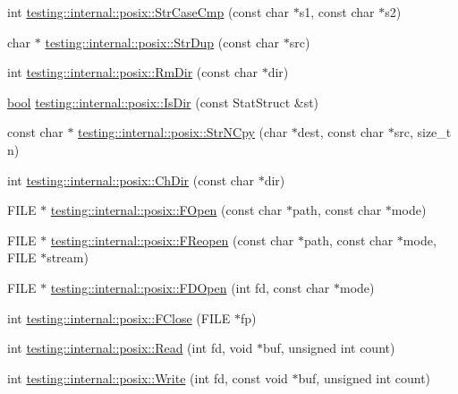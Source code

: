 \begin{DoxyCompactItemize}
\item 
int \hyperlink{namespacetesting_1_1internal_1_1posix_a1ef2385a7f8e4c706054da35967e76bd}{testing\+::internal\+::posix\+::\+Str\+Case\+Cmp} (const char $\ast$s1, const char $\ast$s2)
\item 
char $\ast$ \hyperlink{namespacetesting_1_1internal_1_1posix_a8e352884793a65ae8be144676f1a9136}{testing\+::internal\+::posix\+::\+Str\+Dup} (const char $\ast$src)
\item 
int \hyperlink{namespacetesting_1_1internal_1_1posix_acbad5d4ea5b73fd1765f5f760642932a}{testing\+::internal\+::posix\+::\+Rm\+Dir} (const char $\ast$dir)
\item 
\hyperlink{classbool}{bool} \hyperlink{namespacetesting_1_1internal_1_1posix_af0d04ed5baeed28353fa38742748a421}{testing\+::internal\+::posix\+::\+Is\+Dir} (const Stat\+Struct \&st)
\item 
const char $\ast$ \hyperlink{namespacetesting_1_1internal_1_1posix_a36fca815713332e5c6dc92c98b6b2574}{testing\+::internal\+::posix\+::\+Str\+N\+Cpy} (char $\ast$dest, const char $\ast$src, size\+\_\+t n)
\item 
int \hyperlink{namespacetesting_1_1internal_1_1posix_a1ddc8a4fc6bb21da372307485591a212}{testing\+::internal\+::posix\+::\+Ch\+Dir} (const char $\ast$dir)
\item 
F\+I\+LE $\ast$ \hyperlink{namespacetesting_1_1internal_1_1posix_a4042201dcc4932641d484e7ddf94de7d}{testing\+::internal\+::posix\+::\+F\+Open} (const char $\ast$path, const char $\ast$mode)
\item 
F\+I\+LE $\ast$ \hyperlink{namespacetesting_1_1internal_1_1posix_a9ef6d089cdae03f9d9e0e6d379c40703}{testing\+::internal\+::posix\+::\+F\+Reopen} (const char $\ast$path, const char $\ast$mode, F\+I\+LE $\ast$stream)
\item 
F\+I\+LE $\ast$ \hyperlink{namespacetesting_1_1internal_1_1posix_af7c268eba32d5a718b36b6b3801302e0}{testing\+::internal\+::posix\+::\+F\+D\+Open} (int fd, const char $\ast$mode)
\item 
int \hyperlink{namespacetesting_1_1internal_1_1posix_af4beeaaa8d62916d5e3b644a1ddfbd6b}{testing\+::internal\+::posix\+::\+F\+Close} (F\+I\+LE $\ast$fp)
\item 
int \hyperlink{namespacetesting_1_1internal_1_1posix_a3c6ab13e581a56f1b02f3eb7536c97fd}{testing\+::internal\+::posix\+::\+Read} (int fd, void $\ast$buf, unsigned int count)
\item 
int \hyperlink{namespacetesting_1_1internal_1_1posix_af4acf9f78d55f815a18b43786511abef}{testing\+::internal\+::posix\+::\+Write} (int fd, const void $\ast$buf, unsigned int count)

\end{DoxyCompactItemize}
